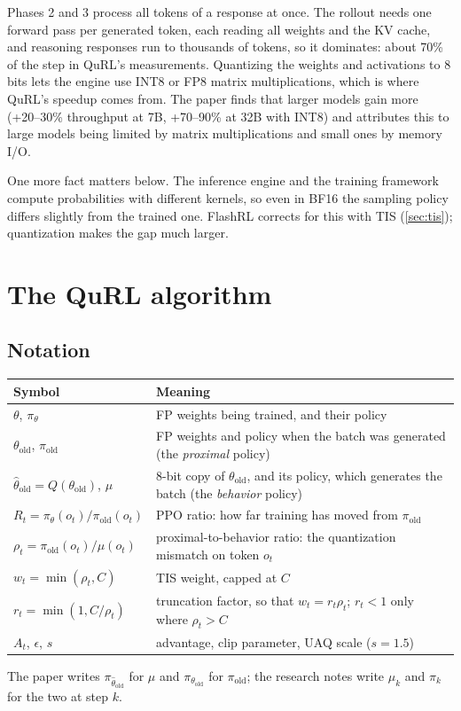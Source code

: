 \documentclass[11pt]{article}
\newcommand{\pold}{\pi_{\mathrm{old}}}
\newcommand{\thold}{\theta_{\mathrm{old}}}
\newcommand{\qthold}{\hat\theta_{\mathrm{old}}}
\begin{document}
Phases 2 and 3 process all tokens of a response at once. The rollout needs one forward pass per generated token, each reading all weights and the KV cache, and reasoning responses run to thousands of tokens, so it dominates: about 70\% of the step in QuRL's measurements. Quantizing the weights and activations to 8 bits lets the engine use INT8 or FP8 matrix multiplications, which is where QuRL's speedup comes from. The paper finds that larger models gain more (+20--30\% throughput at 7B, +70--90\% at 32B with INT8) and attributes this to large models being limited by matrix multiplications and small ones by memory I/O.

One more fact matters below. The inference engine and the training framework compute probabilities with different kernels, so even in BF16 the sampling policy differs slightly from the trained one. FlashRL \citep{yao2025flashrl} corrects for this with TIS (\cref{sec:tis}); quantization makes the gap much larger.

\section{The QuRL algorithm}\label{sec:algorithm}

\subsection{Notation}\label{sec:notation}
\begin{center}\small
\begin{tabularx}{\linewidth}{@{}l L@{}}
\toprule
Symbol & Meaning\\
\midrule
$\theta$, $\pi_\theta$ & FP weights being trained, and their policy\\
$\thold$, $\pold$ & FP weights and policy when the batch was generated (the \emph{proximal} policy)\\
$\qthold=Q(\thold)$, $\mu$ & 8-bit copy of $\thold$, and its policy, which generates the batch (the \emph{behavior} policy)\\
$R_t=\pi_\theta(o_t)/\pold(o_t)$ & PPO ratio: how far training has moved from $\pold$\\
$\rho_t=\pold(o_t)/\mu(o_t)$ & proximal-to-behavior ratio: the quantization mismatch on token $o_t$\\
$w_t=\min(\rho_t,C)$ & TIS weight, capped at $C$\\
$r_t=\min(1,C/\rho_t)$ & truncation factor, so that $w_t=r_t\rho_t$; $r_t<1$ only where $\rho_t>C$\\
$A_t$, $\epsilon$, $s$ & advantage, clip parameter, UAQ scale ($s=1.5$)\\
\bottomrule
\end{tabularx}
\end{center}
The paper writes $\pi_{\qthold}$ for $\mu$ and $\pi_{\thold}$ for $\pold$; the research notes write $\mu_k$ and $\pi_k$ for the two at step $k$.
\end{document}
